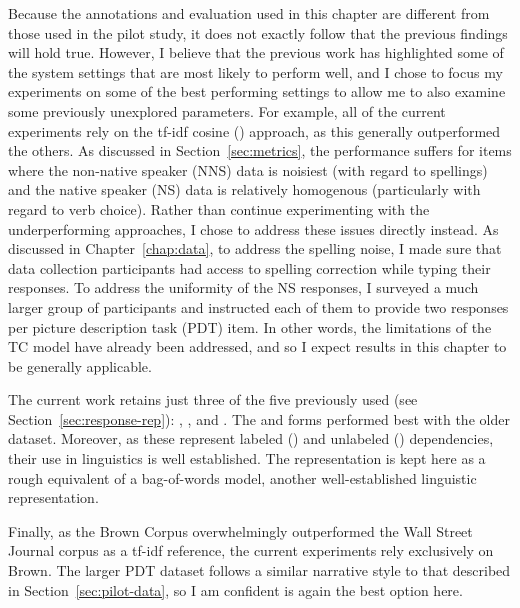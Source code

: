 Because the annotations and evaluation used in this chapter are different from those used in the pilot study, it does not exactly follow that the previous findings will hold true. However, I believe that the previous work has highlighted some of the system settings that are most likely to perform well, and I chose to focus my experiments on some of the best performing settings to allow me to also examine some previously unexplored parameters. For example, all of the current experiments rely on the tf-idf cosine () approach, as this generally outperformed the others. As discussed in Section~\ref{sec:metrics}, the  performance suffers for items where the non-native speaker (NNS) data is noisiest (with regard to spellings) and the native speaker (NS) data is relatively homogenous (particularly with regard to verb choice). Rather than continue experimenting with the underperforming approaches, I chose to address these issues directly instead. As discussed in Chapter~\ref{chap:data}, to address the spelling noise, I made sure that data collection participants had access to spelling correction while typing their responses. To address the uniformity of the NS responses, I surveyed a much larger group of participants and instructed each of them to provide two responses per picture description task (PDT) item. In other words, the limitations of the TC model have already been addressed, and so I expect results in this chapter to be generally applicable.

The current work retains just three of the five  previously used (see Section~\ref{sec:response-rep}): , , and . The  and  forms performed best with the older dataset. Moreover, as these represent labeled () and unlabeled () dependencies, their use in linguistics is well established. The  representation is kept here as a rough equivalent of a bag-of-words model, another well-established linguistic representation.

Finally, as the Brown Corpus overwhelmingly outperformed the Wall Street Journal corpus as a tf-idf reference, the current experiments rely exclusively on Brown. The larger PDT dataset follows a similar narrative style to that described in Section~\ref{sec:pilot-data}, so I am confident  is again the best option here.

